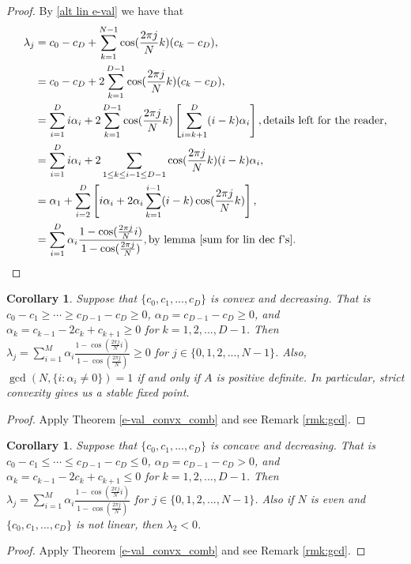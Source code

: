 \documentclass{article}
\newtheorem{cor}[thm]{Corollary}
\newcommand{\1}{\mathbf{1}}
\newcommand{\0}{\mathbf{0}}
\begin{document}
\begin{proof}
By \ref{alt lin e-val} we have that 
\begin{align} \label{e-vals_ring}
\lambda_j &= c_0-c_D + \sum_{k=1}^{N-1} \cos(\frac{2\pi j}{N} k) (c_k - c_D),  \nonumber \\
&= c_0-c_D + 2\sum_{k=1}^{D-1} \cos(\frac{2\pi j}{N} k) (c_k - c_D),  \nonumber \\
&= \sum_{i=1}^D i \alpha_i + 2\sum_{k=1}^{D-1} \cos(\frac{2\pi j}{N} k) \left[\sum_{i=k+1}^D(i-k)\alpha_i \right], \mbox{details left for the reader,} \nonumber \\
&= \sum_{i=1}^D i \alpha_i + 2\sum_{1 \leq k \leq i-1 \leq D-1} \cos(\frac{2\pi j}{N} k) (i-k)\alpha_{i}, \nonumber \\
&= \alpha_1 + \sum_{i=2}^D \left[i \alpha_i + 2\alpha_i \sum_{k=1}^{i-1} (i-k) \cos(\frac{2\pi j}{N} k) \right],  \nonumber \\
&= \sum_{i=1}^D \alpha_{i} \frac{1- \cos(\frac{2\pi j}{N} i)}{1- \cos(\frac{2\pi j}{N})}, \mbox{by lemma \ref{sum for lin dec f's}}.
\end{align}
\end{proof}

\begin{cor}
Suppose that $\{ c_0,c_1,...,c_D \}$ is convex and decreasing.  
That is $c_0-c_1 \geq \cdots \geq c_{D-1} - c_D \geq 0$, $\alpha_D = c_{D-1} - c_D \geq 0$, and $\alpha_k = c_{k-1} - 2c_k +c_{k+1} \geq 0$ for $k = 1,2,...,D-1$.  
Then $\lambda_j = \sum_{i=1}^M \alpha_{i} \frac{1- \cos(\frac{2\pi j}{N} i)}{1- \cos(\frac{2\pi j}{N})} \geq 0$ for $j \in  \{ 0,1,2,...,N-1 \}$.  
Also, $\gcd(N,\{ i: \alpha_i \neq 0 \}) = 1$ if and only if $A$ is positive definite.  
In particular, strict convexity gives us a stable fixed point.
\end{cor}
\begin{proof}
Apply Theorem \ref{e-val_convx_comb} and see Remark \ref{rmk:gcd}.
\end{proof}

\begin{cor}
Suppose that $\{ c_0,c_1,...,c_D \}$ is concave and decreasing.  
That is $c_0-c_1 \leq \cdots \leq c_{D-1} - c_D \leq 0$, $\alpha_D = c_{D-1} - c_D > 0$, and $\alpha_k = c_{k-1} - 2c_k +c_{k+1} \leq 0$ for $k = 1,2,...,D-1$.  
Then $\lambda_j = \sum_{i=1}^M \alpha_{i} \frac{1- \cos(\frac{2\pi j}{N} i)}{1- \cos(\frac{2\pi j}{N})}$ for $j \in  \{ 0,1,2,...,N-1 \}$.
Also if $N$ is even and $\{ c_0,c_1,...,c_D \}$ is not linear, then $\lambda_{2} < 0$.  

\end{cor}
\begin{proof}
Apply Theorem \ref{e-val_convx_comb} and see Remark \ref{rmk:gcd}.
\end{proof}
\end{document}
